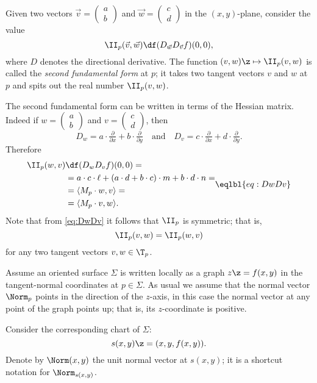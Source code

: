 Given two vectors $\vec v=(\begin{smallmatrix}a\\b
\end{smallmatrix})$ and $\vec w=(\begin{smallmatrix}c\\d
\end{smallmatrix})$ in the $(x,y)$-plane, consider the value 
\[\II_p(\vec v,\vec w)\df(D_{\vec w}D_{\vec v}f)(0,0),\]
where $D$ denotes the directional derivative.
The function $(v,w)\z\mapsto \II_p(v,w)$ is called the \emph{second fundamental form} at $p$;\label{page:second fundamental form}
it takes two tangent vectors $v$ and $w$ at $p$ and spits out the real number $\II_p(v,w)$.

The second fundamental form can be written in terms of the Hessian matrix.
Indeed if 
$w=(\begin{smallmatrix}a\\b
\end{smallmatrix})$ 
and 
$v=(\begin{smallmatrix}c\\d
\end{smallmatrix})$, then 
\[D_w=a\cdot \tfrac\partial{\partial x}+b\cdot \tfrac\partial{\partial y}\quad\text{and}\quad D_v=c\cdot \tfrac\partial{\partial x}+d\cdot \tfrac\partial{\partial y}.\]
Therefore 
\[\begin{aligned}
\II_p(w,v)&\df(D_wD_vf)(0,0)=
\\
&=a\cdot c\cdot \ell+(a\cdot d+ b\cdot c)\cdot m +b\cdot d\cdot n=
\\
&=\langle M_p\cdot w,v\rangle=
\\
&=\langle M_p\cdot v,w\rangle.
\end{aligned}
\eqlbl{eq:DwDv}\]
Note that from \ref{eq:DwDv} it follows that $\II_p$ is symmetric; that is,
\[\II_p(v,w)=\II_p(w,v)\]
for any two tangent vectors $v,w\in \T_p$.





Assume an oriented surface $\Sigma$ is written locally as a graph $z\z=f(x,y)$ in the tangent-normal coordinates at $p\in\Sigma$.
As usual we assume that the normal vector $\Norm_p$ points in the direction of the $z$-axis,
in this case the normal vector at any point of the graph points up; that is, its $z$-coordinate  is positive.

Consider the corresponding chart  of $\Sigma$:
\[s(x,y)\z=(x,y,f(x,y)).\]
Denote by $\Norm(x,y)$ the unit normal vector at $s(x,y)$; it is a shortcut notation for $\Norm_{s(x,y)}$.

